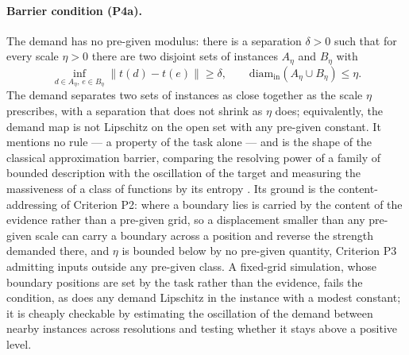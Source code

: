 \paragraph{Barrier condition (P4a).} The demand has no pre-given modulus: there is a separation $\delta > 0$ such that for every scale $\eta > 0$ there are two disjoint sets of instances $A_\eta$ and $B_\eta$ with
\begin{equation}
\inf_{d \in A_\eta ,\, e \in B_\eta} \| t(d) - t(e) \| \ge \delta , \qquad \mathrm{diam}_{\mathrm{in}} (A_\eta \cup B_\eta) \le \eta .
\label{eq:barrier}
\end{equation}
The demand separates two sets of instances as close together as the scale $\eta$ prescribes, with a separation that does not shrink as $\eta$ does; equivalently, the demand map is not Lipschitz on the open set with any pre-given constant. It mentions no rule --- a property of the task alone --- and is the shape of the classical approximation barrier, comparing the resolving power of a family of bounded description with the oscillation of the target \citep{kolmogorov1936,pinkus1985} and measuring the massiveness of a class of functions by its entropy \citep{kolmogorov1961}. Its ground is the content-addressing of Criterion P2: where a boundary lies is carried by the content of the evidence rather than a pre-given grid, so a displacement smaller than any pre-given scale can carry a boundary across a position and reverse the strength demanded there, and $\eta$ is bounded below by no pre-given quantity, Criterion P3 admitting inputs outside any pre-given class. A fixed-grid simulation, whose boundary positions are set by the task rather than the evidence, fails the condition, as does any demand Lipschitz in the instance with a modest constant; it is cheaply checkable by estimating the oscillation of the demand between nearby instances across resolutions and testing whether it stays above a positive level.

